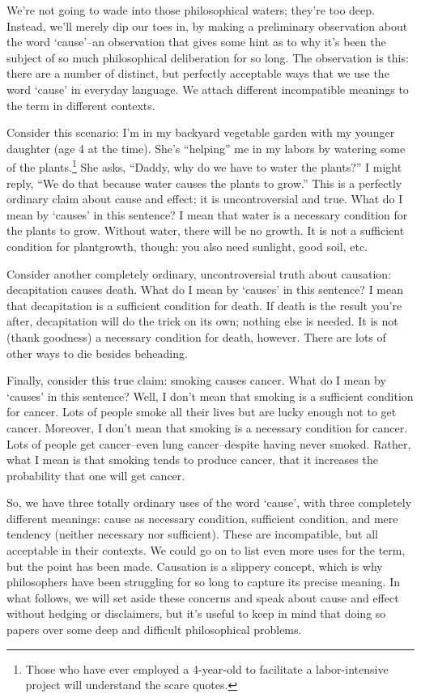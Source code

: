 We're not going to wade into those philosophical waters; they're too deep. Instead, we'll merely
dip our toes in, by making a preliminary observation about the word `cause'--an observation that
gives some hint as to why it's been the subject of so much philosophical deliberation for so long.
The observation is this: there are a number of distinct, but perfectly acceptable ways that we use
the word `cause' in everyday language. We attach different incompatible meanings to the term in
different contexts.

Consider this scenario: I'm in my backyard vegetable garden with my younger daughter (age 4 at
the time). She's ``helping'' me in my labors by watering some of the 
plants.\footnote{Those who have ever employed a 4-year-old to facilitate a labor-intensive project will 
understand the scare quotes.}
She asks, ``Daddy,
why do we have to water the plants?'' I might reply, ``We do that because water causes the plants
to grow.'' This is a perfectly ordinary claim about cause and effect; it is uncontroversial and true.
What do I mean by `causes' in this sentence? I mean that water is a necessary condition for the
plants to grow. Without water, there will be no growth. It is not a 
sufficient condition for plantgrowth, though: you also need sunlight, good soil, etc.

Consider another completely ordinary, uncontroversial truth about causation: decapitation causes
death. What do I mean by `causes' in this sentence? I mean that decapitation is a sufficient
condition for death. If death is the result you're after, decapitation will do the trick on its own;
nothing else is needed. It is not (thank goodness) a necessary condition for death, however. There
are lots of other ways to die besides beheading.

Finally, consider this true claim: smoking causes cancer. What do I mean by `causes' in this
sentence? Well, I don't mean that smoking is a sufficient condition for cancer. Lots of people
smoke all their lives but are lucky enough not to get cancer. Moreover, I don't mean that smoking
is a necessary condition for cancer. Lots of people get cancer--even lung cancer--despite having
never smoked. Rather, what I mean is that smoking tends to produce cancer, that it increases the
probability that one will get cancer.

So, we have three totally ordinary uses of the word `cause', with three completely different
meanings: cause as necessary condition, sufficient condition, and mere tendency (neither necessary
nor sufficient). These are incompatible, but all acceptable in their contexts. We could go on to list
even more uses for the term, but the point has been made. Causation is a slippery concept, which
is why philosophers have been struggling for so long to capture its precise meaning. In what
follows, we will set aside these concerns and speak about cause and effect without hedging or
disclaimers, but it's useful to keep in mind that doing so papers over some deep and difficult
philosophical problems.

